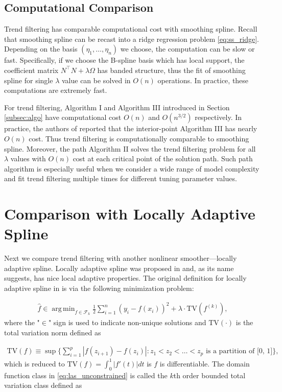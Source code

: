 \documentclass[a4paper]{article}
\DeclareMathOperator*{\argmin}{arg\,min}
\renewcommand{\cal}{\mathcal}
\begin{document}
\subsection{Computational Comparison}
\label{subsec:sscomp}
Trend filtering has comparable computational cost with smoothing spline. Recall that smoothing spline can be recast into a ridge regression problem \eqref{eq:ss_ridge}. Depending on the basis $(\eta_1,\ldots, \eta_n)$ we choose, the computation can be slow or fast. Specifically, if we choose the B-spline basis which has local support, the coefficient matrix $N^\top N+\lambda\Omega$ has banded structure, thus the fit of smoothing spline for single $\lambda$ value can be solved in $O(n)$ operations. In practice, these computations are extremely fast. 

For trend filtering, Algorithm I and Algorithm III introduced in Section \ref{subsec:algo} have computational cost $O(n)$ and $O(n^{3/2})$ respectively. In practice, the authors of \cite{kim2009ell_1} reported that the interior-point Algorithm III has nearly $O(n)$ cost. Thus trend filtering is computationally comparable to smoothing spline. Moreover, the path Algorithm II solves the trend filtering problem for all $\lambda$ values with $O(n)$ cost at each critical point of the solution path. Such path algorithm is especially useful when we consider a wide range of model complexity and fit trend filtering multiple times for different tuning parameter values.

\section{Comparison with Locally Adaptive Spline}
\label{sec:las_compare}

Next we compare trend filtering with another nonlinear smoother---locally adaptive spline. Locally adaptive spline was proposed in \cite{mammen1997locally} and, as its name suggests, has nice local adaptive properties. The original definition for locally adaptive spline in \cite{mammen1997locally} is via the following minimization problem:

\begin{align}
\hat{f} \in \argmin_{f\in\cal{F}_k} \frac{1}{2}\sum_{i=1}^n (y_i - f(x_i))^2 + \lambda\cdot\text{TV}(f^{(k)}),
\label{eq:las_unconstrained}
\end{align}
where the "$\in$" sign is used to indicate non-unique solutions and $\text{TV}(\cdot)$ is the total variation norm defined as 

\begin{align*}
\text{TV}(f) \equiv \sup\{\sum_{i=1}^p |f(z_{i+1}) - f(z_i)|:z_1<z_2<\ldots<z_p \text{ is a partition of [0, 1]}\},
\end{align*}
which is reduced to $\text{TV}(f) = \int_0^1|f'(t)|dt$ is $f$ is differentiable. The domain function class in \eqref{eq:las_unconstrained} is called the $k$th order bounded total variation class defined as 
\end{document}

